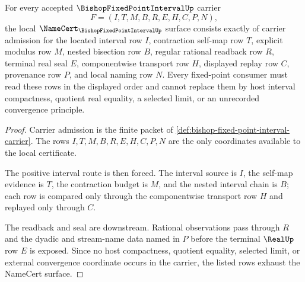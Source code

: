\begin{theorem}
\label{thm:bishop-fixed-point-interval-namecert-obligations}
For every accepted $\BishopFixedPointIntervalUp$ carrier
$$
F=(I,T,M,B,R,E,H,C,P,N),
$$
the local $\NameCert_{\BishopFixedPointIntervalUp}$ surface consists exactly of carrier admission for the located interval row $I$, contraction self-map row $T$, explicit modulus row $M$, nested bisection row $B$, regular rational readback row $R$, terminal real seal $E$, componentwise transport row $H$, displayed replay row $C$, provenance row $P$, and local naming row $N$. Every fixed-point consumer must read these rows in the displayed order and cannot replace them by host interval compactness, quotient real equality, a selected limit, or an unrecorded convergence principle.
\end{theorem}
\begin{proof}
Carrier admission is the finite packet of \autoref{def:bishop-fixed-point-interval-carrier}. The rows $I,T,M,B,R,E,H,C,P,N$ are the only coordinates available to the local certificate.

The positive interval route is then forced. The interval source is $I$, the self-map evidence is $T$, the contraction budget is $M$, and the nested interval chain is $B$; each row is compared only through the componentwise transport row $H$ and replayed only through $C$.

The readback and seal are downstream. Rational observations pass through $R$ and the dyadic and stream-name data named in $P$ before the terminal $\RealUp$ row $E$ is exposed. Since no host compactness, quotient equality, selected limit, or external convergence coordinate occurs in the carrier, the listed rows exhaust the NameCert surface.
\end{proof}

